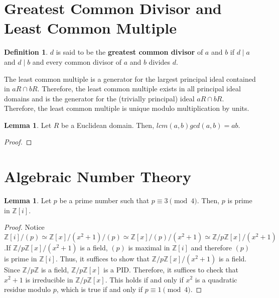 \documentclass{article}
\theoremstyle{definition}
\newtheorem{definition}{Definition}
\newtheorem{lemma}[theorem]{Lemma}
\begin{document}
\newpage

\section{Greatest Common Divisor and Least Common Multiple}

\begin{definition}
    $d$ is said to be the \textbf{greatest common divisor} of $a$ and $b$ if $d \mid a$ and $d \mid b$ and every common divisor of $a$ and $b$ divides $d$.
\end{definition}



The least common multiple is a generator for the largest principal ideal contained in $aR \cap bR$. Therefore, the least common multiple exists in all principal ideal domains and is the generator for the (trivially principal) ideal $aR \cap bR$. Therefore, the least common multiple is unique modulo multiplication by units.

\begin{lemma}
    Let $R$ be a Euclidean domain. Then, $lcm(a,b)gcd(a,b) = ab$.
\end{lemma}

\begin{proof}
    
\end{proof}

\newpage

\section{Algebraic Number Theory}

\begin{lemma}
    Let $p$ be a prime number such that $p \equiv 3 \pmod{4}$. Then, $p$ is prime in $\mathbb{Z}[i]$.
\end{lemma}

\begin{proof}
    Notice $\mathbb{Z}[i]/(p) \simeq \mathbb{Z}[x]/(x^{2} + 1)/(p) 
    \simeq \mathbb{Z}[x]/(p)/(x^{2} + 1) \simeq 
    \mathbb{Z}/p\mathbb{Z}[x]/(x^{2}+1)$
    .If $\mathbb{Z}/p\mathbb{Z}[x]/(x^{2}+1)$ is a field, 
    $(p)$ is maximal in $\mathbb{Z}[i]$ and therefore $(p)$
     is prime in $\mathbb{Z}[i]$.
    Thus, it suffices to show that $\mathbb{Z}/p\mathbb{Z}[x]/(x^{2}+1)$ 
    is a field. 
    Since $\mathbb{Z}/p\mathbb{Z}$ is a field, $\mathbb{Z}/p\mathbb{Z}[x]$
    is a PID. Therefore, it suffices to check that $x^{2} + 1$ is 
    irreducible in $\mathbb{Z}/p\mathbb{Z}[x]$. 
    This holds if and only if $x^{2}$ is a quadratic residue 
    modulo $p$, which is true if and only if $p \equiv 1 \pmod 4$.
\end{proof}
\end{document}
